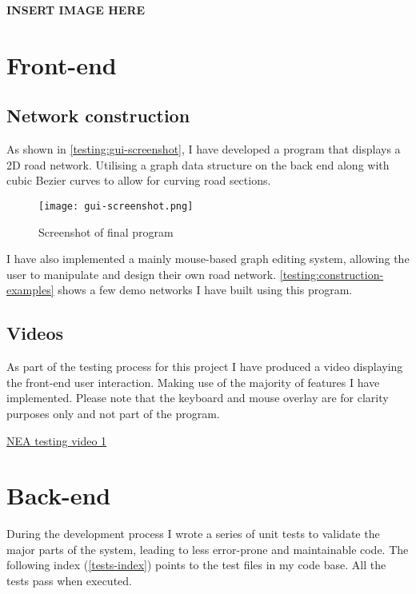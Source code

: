             \textbf{INSERT IMAGE HERE}

\section{Front-end}

    \subsection{Network construction}

        As shown in \autoref{testing:gui-screenshot}, I have developed a program that displays a 2D road network. Utilising a graph data structure on the back end along with cubic Bezier curves to allow for curving road sections.

        \begin{figure}
            \centering
            \texttt{[image: gui-screenshot.png]}
            \caption{Screenshot of final program}
            \label{testing:gui-screenshot}
        \end{figure}

        I have also implemented a mainly mouse-based graph editing system, allowing the user to manipulate and design their own road network. \autoref{testing:construction-examples} shows a few demo networks I have built using this program.


    \subsection{Videos}

        As part of the testing process for this project I have produced a video displaying the front-end user interaction. Making use of the majority of features I have implemented. Please note that the keyboard and mouse overlay are for clarity purposes only and not part of the program.

        \href{https://youtu.be/RnU7ZQtnQWU}{NEA testing video 1}

\section{Back-end}

    During the development process I wrote a series of unit tests to validate the major parts of the system, leading to less error-prone and maintainable code. The following index (\autoref{tests-index}) points to the test files in my code base. All the tests pass when executed.

